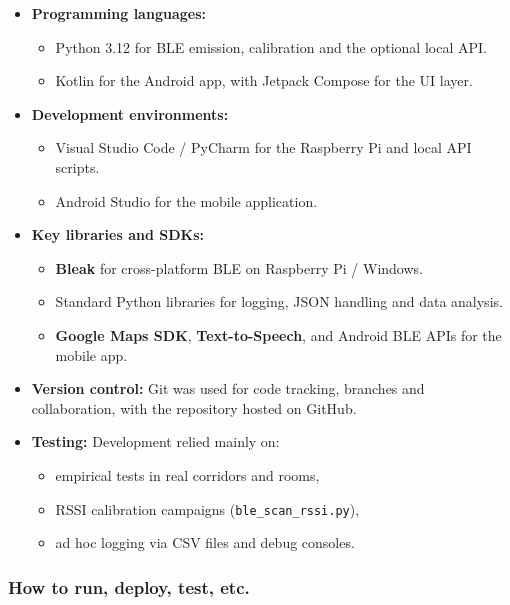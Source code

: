 \documentclass[12pt,a4paper]{article}
\begin{document}
\begin{itemize}
    \item \textbf{Programming languages:}
    \begin{itemize}
        \item Python 3.12 for BLE emission, calibration and the optional local API.
        \item Kotlin for the Android app, with Jetpack Compose for the UI layer.
    \end{itemize}

    \item \textbf{Development environments:}
    \begin{itemize}
        \item Visual Studio Code / PyCharm for the Raspberry Pi and local API scripts.
        \item Android Studio for the mobile application.
    \end{itemize}

    \item \textbf{Key libraries and SDKs:}
    \begin{itemize}
        \item \textbf{Bleak} for cross-platform BLE on Raspberry Pi / Windows.
        \item Standard Python libraries for logging, JSON handling and data analysis.
        \item \textbf{Google Maps SDK}, \textbf{Text-to-Speech}, and Android BLE APIs for the mobile app.
    \end{itemize}

    \item \textbf{Version control:} Git was used for code tracking, branches and collaboration, with the repository hosted on GitHub.

    \item \textbf{Testing:} Development relied mainly on:
    \begin{itemize}
        \item empirical tests in real corridors and rooms,
        \item RSSI calibration campaigns (\texttt{ble\_scan\_rssi.py}),
        \item ad hoc logging via CSV files and debug consoles.
    \end{itemize}
\end{itemize}

\subsubsection{How to run, deploy, test, etc.}
\end{document}
